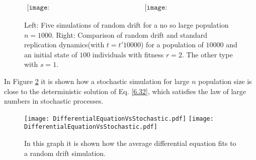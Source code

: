 \begin{figure}[H]
\begin{center}$
\begin{array}{cc}
\texttt{[image: RandomDriftSimulations5.pdf]} &
\texttt{[image: SelectionVsRandom.pdf]}
\end{array}$
\end{center}
\caption{Left: Five simulations of random drift for a no so large population $n=1000$. Right: Comparison of random drift and standard replication dynamics(with $t=t' 10000$) for a population of $10000$ and an initial state of $100$ individuals with fitness $r=2$. The other type with $s=1$.}
\label{Fig6.1}
\end{figure}
  
In  Figure \ref{Fig6.2} it is shown how a stochastic simulation for large $n$ population size is close to the deterministic solution of  Eq. \eqref{6.32}, which satisfies the  law of large numbers in stochastic processes.  

  \begin{figure}[H]
  \begin{center}
    \leavevmode
    \ifpdf
      \texttt{[image: DifferentialEquationVsStochastic.pdf]}
    \else
      \texttt{[image: DifferentialEquationVsStochastic.pdf]}
    \fi
    \caption{In this graph it is shown how the average differential equation fits to a random drift simulation.}
    \label{Fig6.2}
  \end{center}
  \end{figure}


